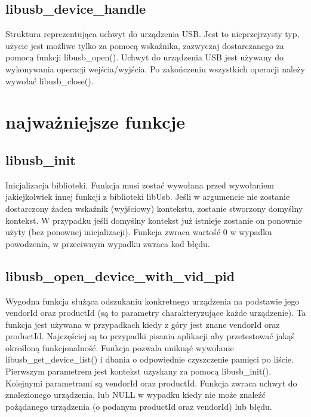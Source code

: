 \documentclass{BscUS}
\begin{document}
\subsection{libusb\_device\_handle}
Struktura reprezentująca uchwyt do urządzenia USB.
\newline
Jest to nieprzejrzysty typ, użycie jest możliwe tylko za pomocą wskaźnika, zazwyczaj dostarczanego za pomocą funkcji libusb\_open().
\newline
Uchwyt do urządzenia USB jest używany do wykonywania operacji wejścia/wyjścia. Po zakończeniu wszystkich operacji należy wywołać libusb\_close().

\section{najważniejsze funkcje}
\subsection{libusb\_init}
Inicjalizacja biblioteki.
\newline
Funkcja musi zostać wywołana przed wywołaniem jakiejkolwiek innej funkcji z biblioteki libUsb.
\newline
Jeśli w argumencie nie zostanie dostarczony żaden wskaźnik (wyjściowy) kontekstu, zostanie stworzony domyślny kontekst. W przypadku jeśli domyślny kontekst już istnieje zostanie on ponownie użyty (bez ponownej inicjalizacji).
\newline
Funkcja zwraca wartość 0 w wypadku powodzenia, w przeciwnym wypadku zwraca kod błędu.
\subsection{libusb\_open\_device\_with\_vid\_pid}
Wygodna funkcja służąca odszukaniu konkretnego urządzenia na podstawie jego vendorId oraz productId (są to parametry charakteryzujące każde urządzenie).
\newline
Ta funkcja jest używana w przypadkach kiedy z góry jest znane vendorId oraz productId. Najczęściej są to przypadki pisania aplikacji aby przetestować jakąś określoną funkcjonalność. Funkcja pozwala uniknąć wywołanie libusb\_get\_device\_list() i dbania o odpowiednie czyszczenie pamięci po liście.
\newline
Pierwszym parametrem jest kontekst uzyskany za pomocą libusb\_init().
\newline
Kolejnymi parametrami są vendorId oraz productId.
\newline
Funkcja zwraca uchwyt do znalezionego urządzenia, lub NULL w wypadku kiedy nie może znaleźć pożądanego urządzenia (o podanym productId oraz vendorId) lub błędu.
\end{document}
